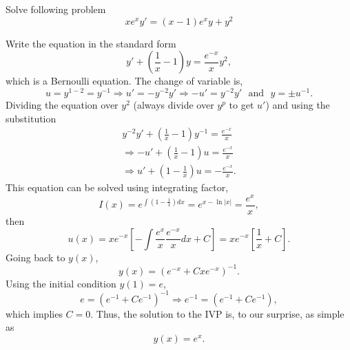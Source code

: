 \documentclass[11pt]{article}
\begin{document}




\begin{problem}
Solve following problem
\begin{equation*}
      xe^{x}y'= (x-1)e^{x}y+y^{2}
\end{equation*}
\end{problem}
\begin{solution}
Write the equation in the standard form
\[y'+\left( \frac{1}{x} - 1 \right)y=\frac{e^{-x}}{x}y^{2},\]
which is a Bernoulli equation. The change of variable is,
\[u = y^{1-2}=y^{-1}\Rightarrow u'=- y^{-2}y' \Rightarrow -u'= y^{-2}y' \,\,\text{ and }\,\, y = \pm u^{-1}.\]
Dividing the equation over $y^{2}$ (always divide over $y^{p}$ to get $u'$) and using the substitution
\begin{gather*}
y^{-2}y'+\left( \frac{1}{x} - 1 \right)y^{-1}=\frac{e^{-x}}{x} \\
\Rightarrow -u' + \left( \frac{1}{x} - 1 \right)u=\frac{e^{-x}}{x} \\
\Rightarrow u' + \left( 1 - \frac{1}{x} \right) u= -\frac{e^{-x}}{x}.
\end{gather*}
This equation can be solved using integrating factor,
\[I(x)=e^{\int\left( 1 - \frac{1}{x} \right) dx}=e^{x - \ln |x|}=\frac{e^{x}}{x},\]
then
\[u(x)= xe^{-x}\left[-\int \frac{e^{x}}{x} \frac{e^{-x}}{x} dx + C\right]= xe^{-x}\left[\frac{1}{x} + C \right].\]
Going back to $y(x)$,
\[y(x)= \left( e^{-x}  + Cxe^{-x} \right)^{-1}.\]
Using the initial condition $y(1)=e$,
\[e=\left( e^{-1}  + Ce^{-1} \right)^{-1}\Rightarrow e^{-1}=\left( e^{-1}  + Ce^{-1} \right),\]
which implies $C=0$. Thus, the solution to the IVP is, to our surprise, as simple as
\[\boxed{y(x)= e^{x}}.\]
\end{solution}
\end{document}
